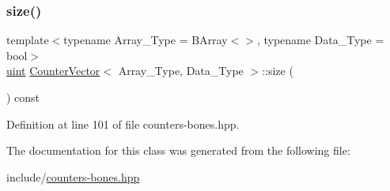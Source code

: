 \subsubsection{\texorpdfstring{size()}{size()}}
{\footnotesize\ttfamily template$<$typename Array\+\_\+\+Type = B\+Array$<$$>$, typename Data\+\_\+\+Type = bool$>$ \\
\hyperlink{typedefs_8hpp_a91ad9478d81a7aaf2593e8d9c3d06a14}{uint} \hyperlink{class_counter_vector}{Counter\+Vector}$<$ Array\+\_\+\+Type, Data\+\_\+\+Type $>$\+::size (\begin{DoxyParamCaption}{ }\end{DoxyParamCaption}) const\hspace{0.3cm}{\ttfamily [inline]}}



Definition at line 101 of file counters-\/bones.\+hpp.



The documentation for this class was generated from the following file\+:\begin{DoxyCompactItemize}
\item 
include/\hyperlink{counters-bones_8hpp}{counters-\/bones.\+hpp}\end{DoxyCompactItemize}
